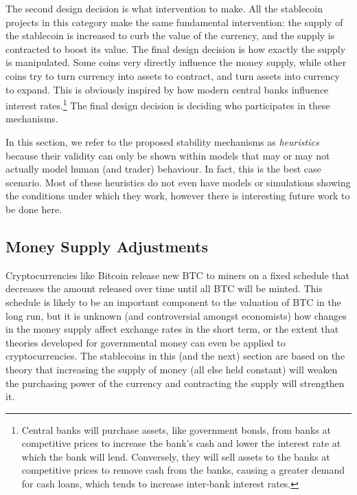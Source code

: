 The second design decision is what intervention to make. All the stablecoin projects in this category make the same fundamental intervention: the supply of the stablecoin is increased to curb the value of the currency, and the supply is contracted to boost its value. The final design decision is how exactly the supply is manipulated. Some coins very directly influence the money supply, while other coins try to turn currency into assets to contract, and turn assets into currency to expand. This is obviously inspired by how modern central banks influence interest rates.\footnote{Central banks will purchase assets, like government bonds, from banks at competitive prices to increase the bank's cash and lower the interest rate at which the bank will lend. Conversely, they will sell assets to the banks at competitive prices to remove cash from the banks, causing a greater demand for cash loans, which tends to increase inter-bank interest rates.} The final design decision is deciding who participates in these mechanisms. 

In this section, we refer to the proposed stability mechanisms as \textit{heuristics} because their validity can only be shown within models that may or may not actually model human (and trader) behaviour. In fact, this is the best case scenario. Most of these heuristics do not even have models or simulations showing the conditions under which they work, however there is interesting future work to be done here. 



\subsection{Money Supply Adjustments}
\label{sec:elastic}

Cryptocurrencies like Bitcoin release new BTC to miners on a fixed schedule that decreases the amount released over time until all BTC will be minted. This schedule is likely to be an important component to the valuation of BTC in the long run, but it is unknown (and controversial amongst economists) how changes in the money supply affect exchange rates in the short term, or the extent that theories developed for governmental money can even be applied to cryptocurrencies. The stablecoins in this (and the next) section are based on the theory that increasing the supply of money (all else held constant) will weaken the purchasing power of the currency and contracting the supply will strengthen it.

